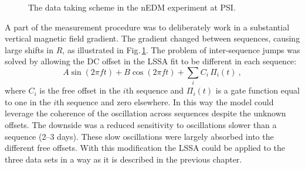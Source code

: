 \begin{figure}
  \centering
  \quad
  \caption{The data taking scheme in the nEDM experiment at PSI. }\label{fig:oscillating_nEDM_in_R}
\end{figure}

A part of the measurement procedure was to deliberately work in a substantial vertical magnetic field gradient. The gradient changed between sequences, causing large shifts in $R$, as illustrated in Fig.\,\ref{fig:oscillating_nEDM_in_R}. The problem of inter-sequence jumps was solved by allowing the DC offset in the LSSA fit to be different in each sequence:
\begin{equation}
  \label{eq:axions_LSSA}
  A\sin(2 \pi f t) + B\cos(2 \pi f t) + \sum_i C_i\,\Pi_i(t) \ ,
\end{equation}
where $C_i$ is the free offset in the $i$th sequence and $\Pi_i(t)$ is a gate function equal to one in the $i$th sequence and zero elsewhere. In this way the model could leverage the coherence of the oscillation across sequences despite the unknown offsets. The downside was a reduced sensitivity to oscillations slower than a sequence (2--3 days). These slow oscillations were largely absorbed into the different free offsets. With this modification the LSSA could be applied to the three data sets in a way as it is described in the previous chapter.

